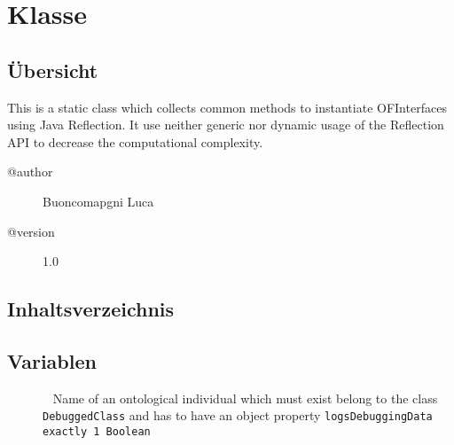 
\section[ReflactionInstanciater]{Klasse }\label{ontologyFramework.OFRunning.OFInvokingManager.ReflactionInstanciater-class}
\subsection{Übersicht}
This is a static class which collects common methods to instantiate OFInterfaces using 
 Java Reflection. It use neither generic nor dynamic usage of the Reflection API to 
 decrease the computational complexity.
\begin{description}
\item[@author] 
Buoncomapgni Luca
\item[@version] 
1.0
\end{description}
\subsection{Inhaltsverzeichnis}
\subsection{Variablen}
\begin{description}
\item[{\label{ontologyFramework.OFRunning.OFInvokingManager.ReflactionInstanciater.REFLACTIONDERDEBUG_individualName}}]
~ Name of an ontological individual which must exist belong to the class \verb!DebuggedClass!
 and has to have an object property \verb!logsDebuggingData exactly 1 Boolean!
\end{description}
